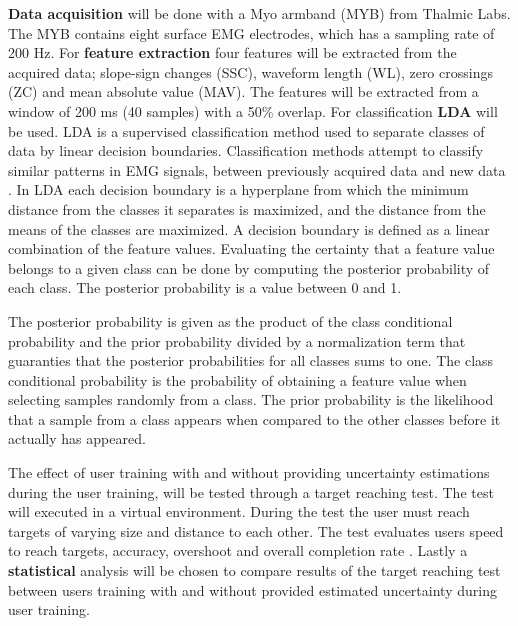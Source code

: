 

\textbf{Data acquisition} will be done with a Myo armband (MYB) from Thalmic Labs. The MYB contains eight surface EMG electrodes, which has a sampling rate of 200 Hz.
For \textbf{feature extraction} four features will be extracted from the acquired data; slope-sign changes (SSC), waveform length (WL), zero crossings (ZC) and mean absolute value (MAV). The features will be extracted from a window of 200 ms (40 samples) with a 50\% overlap.
For classification \textbf{LDA} will be used. LDA is a supervised classification method used to separate classes of data by linear decision boundaries. Classification methods attempt to classify similar patterns in EMG signals, between previously acquired data and new data \cite{Mendez2017}. In LDA each decision boundary is a hyperplane from which the minimum distance from the classes it separates is maximized, and the distance from the means of the classes are maximized. A decision boundary is defined as a linear combination of the feature values.
Evaluating the certainty that a feature value belongs to a given class can be done by computing the posterior probability of each class. The posterior probability is a value between 0 and 1.

The posterior probability is given as the product of the class conditional probability and the prior probability divided by a normalization term that guaranties that the posterior probabilities for all classes sums to one. The class conditional probability is the probability of obtaining a feature value when selecting samples randomly from a class. The prior probability is the likelihood that a sample from a class appears when compared to the other classes before it actually has appeared.

The effect of user training with and without providing uncertainty estimations during the user training, will be tested through a target reaching test. The test will executed in a virtual environment. During the test the user must reach targets of varying size and distance to each other. The test evaluates users speed to reach targets, accuracy, overshoot and overall completion rate \cite{Scheme2013}. 
Lastly a \textbf{statistical} analysis will be chosen to compare results of the target reaching test between users training with and without provided estimated uncertainty during user training.


